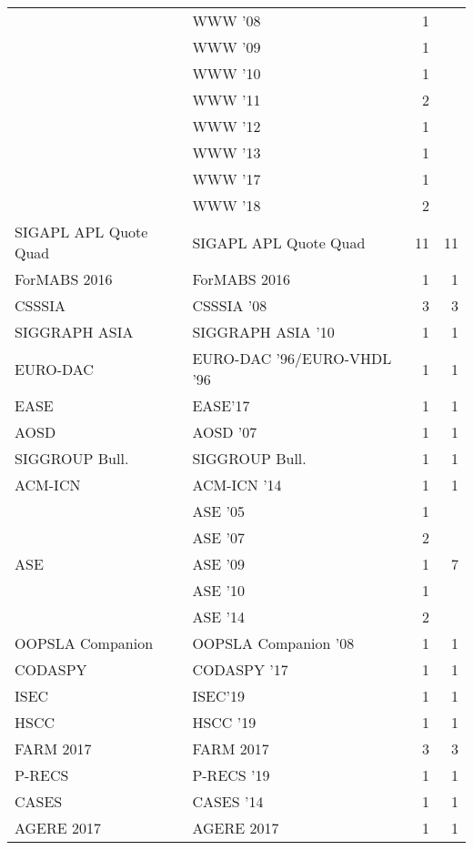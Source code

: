 \begin{table*}[t]
\begin{tabular}{llrr}
& WWW '08 & 1 &\\
& WWW '09 & 1 &\\
& WWW '10 & 1 &\\
& WWW '11 & 2 &\\
& WWW '12 & 1 &\\
& WWW '13 & 1 &\\
& WWW '17 & 1 &\\
& WWW '18 & 2 &\\
\multirow{1}{*}{SIGAPL APL Quote Quad} & SIGAPL APL Quote Quad & 11 & \multirow{1}{*}{11}\\
\multirow{1}{*}{ForMABS 2016} & ForMABS 2016 & 1 & \multirow{1}{*}{1}\\
\multirow{1}{*}{CSSSIA } & CSSSIA '08 & 3 & \multirow{1}{*}{3}\\
\multirow{1}{*}{SIGGRAPH ASIA } & SIGGRAPH ASIA '10 & 1 & \multirow{1}{*}{1}\\
\multirow{1}{*}{EURO-DAC } & EURO-DAC '96/EURO-VHDL '96 & 1 & \multirow{1}{*}{1}\\
\multirow{1}{*}{EASE} & EASE'17 & 1 & \multirow{1}{*}{1}\\
\multirow{1}{*}{AOSD } & AOSD '07 & 1 & \multirow{1}{*}{1}\\
\multirow{1}{*}{SIGGROUP Bull.} & SIGGROUP Bull. & 1 & \multirow{1}{*}{1}\\
\multirow{1}{*}{ACM-ICN } & ACM-ICN '14 & 1 & \multirow{1}{*}{1}\\
\multirow{5}{*}{ASE } & ASE '05 & 1 & \multirow{5}{*}{7}\\
& ASE '07 & 2 &\\
& ASE '09 & 1 &\\
& ASE '10 & 1 &\\
& ASE '14 & 2 &\\
\multirow{1}{*}{OOPSLA Companion } & OOPSLA Companion '08 & 1 & \multirow{1}{*}{1}\\
\multirow{1}{*}{CODASPY } & CODASPY '17 & 1 & \multirow{1}{*}{1}\\
\multirow{1}{*}{ISEC} & ISEC'19 & 1 & \multirow{1}{*}{1}\\
\multirow{1}{*}{HSCC } & HSCC '19 & 1 & \multirow{1}{*}{1}\\
\multirow{1}{*}{FARM 2017} & FARM 2017 & 3 & \multirow{1}{*}{3}\\
\multirow{1}{*}{P-RECS } & P-RECS '19 & 1 & \multirow{1}{*}{1}\\
\multirow{1}{*}{CASES } & CASES '14 & 1 & \multirow{1}{*}{1}\\
\multirow{1}{*}{AGERE 2017} & AGERE 2017 & 1 & \multirow{1}{*}{1}\\

\end{tabular}
\end{table*}
